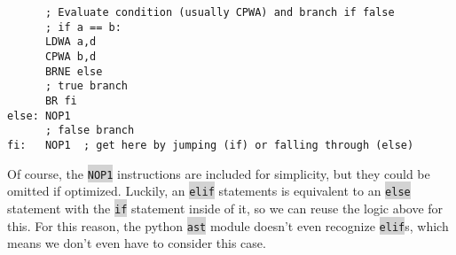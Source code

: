 \documentclass[12pt]{article}
\newcommand{\code}[1]{\colorbox{LightGray}{\texttt{#1}}}
\begin{document}
\begin{verbatim}
      ; Evaluate condition (usually CPWA) and branch if false
      ; if a == b:
      LDWA a,d
      CPWA b,d
      BRNE else
      ; true branch
      BR fi
else: NOP1
      ; false branch
fi:   NOP1  ; get here by jumping (if) or falling through (else)
\end{verbatim}
Of course, the \code{NOP1} instructions are included for simplicity, but they could be omitted if optimized. Luckily, an \code{elif} statements is equivalent to an \code{else} statement with the \code{if} statement inside of it, so we can reuse the logic above for this. For this reason, the python \code{ast} module doesn't even recognize \code{elif}s, which means we don't even have to consider this case.
\end{document}
